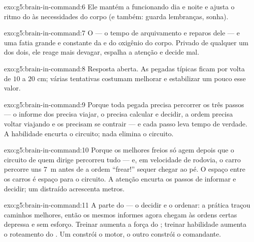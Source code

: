 \begin{solution}{exo:g5:brain-in-command:6}
Ele mantém a  funcionando dia e noite e ajusta o ritmo do
 às necessidades do corpo (e também: guarda lembranças,
sonha).
\end{solution}

\begin{solution}{exo:g5:brain-in-command:7}
O  --- o tempo de arquivamento e reparos dele --- e uma fatia
grande e constante da  e do oxigênio do corpo. Privado de
qualquer um dos dois, ele reage mais devagar, espalha a atenção e
decide mal.
\end{solution}

\begin{solution}{exo:g5:brain-in-command:8}
Resposta aberta. As pegadas típicas ficam por volta de $10$ a $20$
cm; várias tentativas costumam melhorar e estabilizar um pouco esse
valor.
\end{solution}

\begin{solution}{exo:g5:brain-in-command:9}
Porque toda pegada precisa percorrer os três passos --- o informe
dos  precisa viajar, o  precisa calcular e decidir, a
ordem precisa voltar viajando e os  precisam se contrair ---
e cada passo leva tempo de verdade. A habilidade encurta o circuito;
nada elimina o circuito.
\end{solution}

\begin{solution}{exo:g5:brain-in-command:10}
Porque os melhores freios só agem depois que o circuito de quem
dirige percorreu tudo --- e, em velocidade de rodovia, o carro
percorre uns \qty{7}{m} antes de a ordem ``frear!'' sequer chegar ao
pé. O espaço entre os carros é espaço para o circuito. A atenção
encurta os passos de informar e decidir; um  distraído
acrescenta metros.
\end{solution}

\begin{solution}{exo:g5:brain-in-command:11}
A parte do  --- o decidir e o ordenar: a prática traçou
caminhos melhores, então os mesmos informes agora chegam às ordens
certas depressa e sem esforço. Treinar  aumenta a força do
; treinar habilidade aumenta o roteamento do . Um
constrói o motor, o outro constrói o comandante.
\end{solution}

